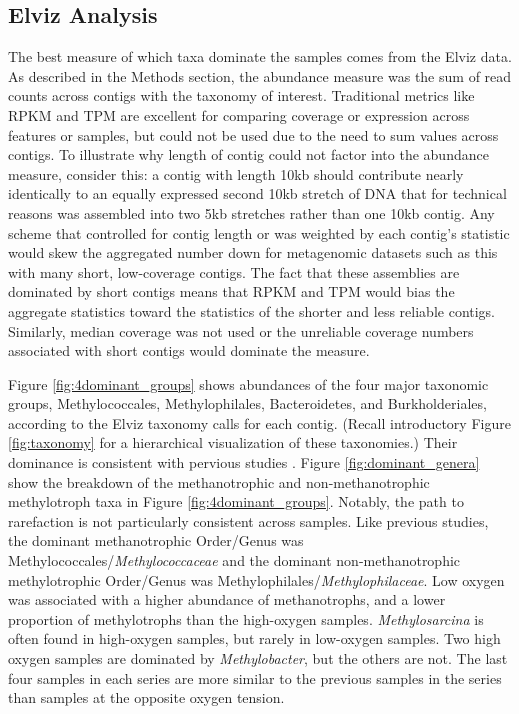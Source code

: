 \subsection{Elviz Analysis}

The best measure of which taxa dominate the samples comes from the Elviz \cite{cantor2015} data.
As described in the Methods section, the abundance measure was the sum of read counts across contigs with the taxonomy of interest.
Traditional metrics like RPKM \cite{mortazavi2008} and TPM \cite{wagner2012} are excellent for comparing coverage or expression across features or samples, but could not be used due to the need to sum values across contigs.
To illustrate why length of contig could not factor into the abundance measure, consider this:
a contig with length 10kb should contribute nearly identically to an equally expressed second 10kb stretch of DNA that for technical reasons was assembled into two 5kb stretches rather than one 10kb contig.
Any scheme that controlled for contig length or was weighted by each contig's statistic would skew the aggregated number down for metagenomic datasets such as this with many short, low-coverage contigs.
The fact that these assemblies are dominated by short contigs means that RPKM and TPM would bias the aggregate statistics toward the statistics of the shorter and less reliable contigs.
Similarly, median coverage was not used or the unreliable coverage numbers associated with short contigs would dominate the measure.

Figure \ref{fig:4dominant_groups} shows abundances of the four major taxonomic groups, Methylococcales, Methylophilales, Bacteroidetes, and Burkholderiales, according to the Elviz taxonomy calls for each contig. %
(Recall introductory Figure \ref{fig:taxonomy} for a hierarchical visualization of these taxonomies.)
Their dominance is consistent with pervious studies \cite{beck2013LW, beck2014LW, oshkin2015LW, hernandez2015LW, kalyuzhnaya2008Burkholderiales}.
Figure \ref{fig:dominant_genera} show the breakdown of the methanotrophic and non-methanotrophic methylotroph taxa in Figure \ref{fig:4dominant_groups}.
Notably, the path to rarefaction is not particularly consistent across samples.
Like previous studies, the dominant methanotrophic Order/Genus was Methylococcales/\textit{Methylococcaceae} and the dominant non-methanotrophic methylotrophic Order/Genus was Methylophilales/\textit{Methylophilaceae}.
Low oxygen was associated with a higher abundance of methanotrophs, and a lower proportion of methylotrophs than the high-oxygen samples.
\textit{Methylosarcina} is often found in high-oxygen samples, but rarely in low-oxygen samples.
Two high oxygen samples are dominated by \textit{Methylobacter}, but the others are not.
The last four samples in each series are more similar to the previous samples in the series than samples at the opposite oxygen tension.


